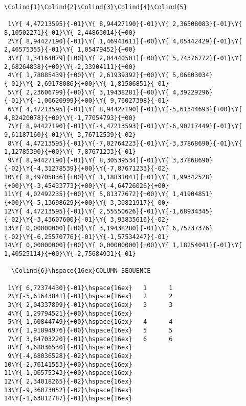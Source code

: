 \begin{landscape}
\begin{Verbatim}[commandchars=\\\{\},codes={\catcode`$=3\catcode`_=8}]
  \Colind{1}\Colind{2}\Colind{3}\Colind{4}\Colind{5}

 1\Y{ 4,47213595}{-01}\Y{ 8,94427190}{-01}\Y{ 2,36508083}{-01}\Y{ 8,10502271}{-01}\Y{ 2,44863014}{+00}
 2\Y{ 8,94427190}{-01}\Y{ 1,46941611}{+00}\Y{ 4,05442429}{-01}\Y{ 2,46575355}{-01}\Y{ 1,05479452}{+00}
 3\Y{ 1,34164079}{+00}\Y{ 2,04440501}{+00}\Y{ 5,74376772}{-01}\Y{ 2,68264838}{+00}\Y{-2,33904111}{+00}
 4\Y{ 1,78885439}{+00}\Y{ 2,61939392}{+00}\Y{ 5,06803034}{-01}\Y{-2,69178086}{+00}\Y{-1,81506851}{-01}
 5\Y{ 2,23606799}{+00}\Y{ 3,19438281}{+00}\Y{ 4,39229296}{-01}\Y{-1,06620999}{+00}\Y{ 9,76027398}{-01}
 6\Y{ 4,47213595}{-01}\Y{ 8,94427190}{-01}\Y{-5,61344693}{+00}\Y{ 4,82420078}{+00}\Y{-1,77054793}{+00}
 7\Y{ 8,94427190}{-01}\Y{-4,47213593}{-01}\Y{-6,90217449}{-01}\Y{ 9,61187160}{-01}\Y{ 3,76712539}{-02}
 8\Y{ 4,47213595}{-01}\Y{-7,02764223}{-01}\Y{-3,37868690}{-01}\Y{ 1,12785390}{+00}\Y{ 7,87671233}{-01}
 9\Y{ 8,94427190}{-01}\Y{ 8,30539534}{-01}\Y{ 3,37868690}{-02}\Y{-4,31278539}{+00}\Y{-7,87671233}{-02}
10\Y{ 8,49705836}{+00}\Y{ 1,18831041}{+01}\Y{ 1,99342528}{+00}\Y{-3,45433773}{+00}\Y{-4,64726026}{+00}
11\Y{ 4,02492235}{+00}\Y{ 5,81377672}{+00}\Y{ 1,41904851}{+00}\Y{-5,13698629}{+00}\Y{-3,30821917}{-00}
12\Y{ 4,47213595}{-01}\Y{ 2,55550626}{-01}\Y{-1,68934345}{-02}\Y{-3,43607600}{-01}\Y{ 3,93835616}{-02}
13\Y{ 0,00000000}{+00}\Y{ 3,19438280}{-01}\Y{ 6,75737376}{-02}\Y{-6,25570776}{-01}\Y{-1,57534247}{-01}
14\Y{ 0,00000000}{+00}\Y{ 0,00000000}{+00}\Y{ 1,18254041}{-01}\Y{ 1,40525114}{+00}\Y{-2,75684931}{-01}

  \Colind{6}\hspace{16ex}COLUMN SEQUENCE

 1\Y{ 6,72374430}{-01}\hspace{16ex}   1      1
 2\Y{-5,61643841}{-01}\hspace{16ex}   2      2
 3\Y{ 2,04337899}{-01}\hspace{16ex}   3      3
 4\Y{ 1,29794521}{+00}\hspace{16ex}
 5\Y{-1,60844749}{+00}\hspace{16ex}   4      4
 6\Y{ 1,91894976}{+00}\hspace{16ex}   5      5
 7\Y{ 3,84703220}{-01}\hspace{16ex}   6      6
 8\Y{ 4,68036530}{-01}\hspace{16ex}
 9\Y{-4,68036528}{-02}\hspace{16ex}
10\Y{-2,76141553}{+00}\hspace{16ex}
11\Y{-1,96575343}{+00}\hspace{16ex}
12\Y{ 2,34018265}{-02}\hspace{16ex}
13\Y{-9,36073052}{-02}\hspace{16ex}
14\Y{-1,63812787}{-01}\hspace{16ex}
\end{Verbatim}

\end{landscape}
